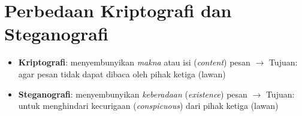 \documentclass{article}
\begin{document}

\section*{Perbedaan Kriptografi dan Steganografi}

\begin{itemize}
    \item \textbf{Kriptografi}: menyembunyikan \textit{makna} atau isi (\textit{content}) pesan
    $\rightarrow$ Tujuan: agar pesan tidak dapat dibaca oleh pihak ketiga (lawan)
    
    \item \textbf{Steganografi}: menyembunyikan \textit{keberadaan} (\textit{existence}) pesan
    $\rightarrow$ Tujuan: untuk menghindari kecurigaan (\textit{conspicuous}) dari pihak ketiga (lawan)
\end{itemize}
\end{document}
